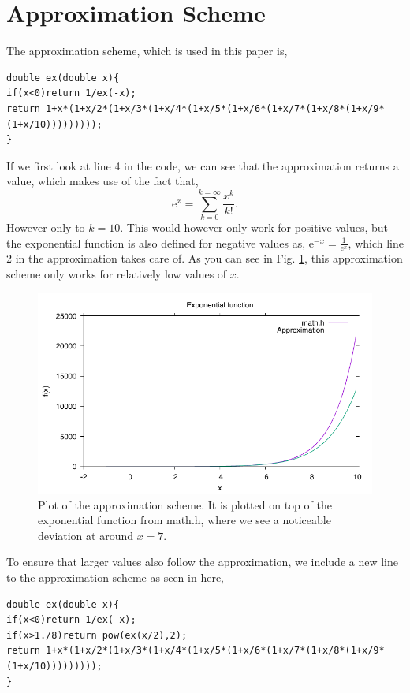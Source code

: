 \documentclass[12pt,a4paper,oneside]{article}
\begin{document}
\section{Approximation Scheme}
The approximation scheme, which is used in this paper is,
\begin{lstlisting}[style=CStyle]
double ex(double x){
if(x<0)return 1/ex(-x);
return 1+x*(1+x/2*(1+x/3*(1+x/4*(1+x/5*(1+x/6*(1+x/7*(1+x/8*(1+x/9*(1+x/10)))))))));
}
\end{lstlisting}
If we first look at line 4 in the code, we can see that the approximation returns a value, which makes use of the fact that,
\begin{equation}
    \text{e}^{x}= \sum_{k=0}^{k=\infty}\frac{x^{k}}{k!}.
\end{equation}
However only to $k=10$. This would however only work for positive values, but the exponential function is also defined for negative values as, $\text{e}^{-x}=\frac{1}{\text{e}^{x}}$, which line 2 in the approximation takes care of. As you can see in Fig. \ref{fig:plot}, this approximation scheme only works for relatively low values of $x$. 
\begin{figure}[H]
  \centering
  \includegraphics[width=\textwidth]{plot.pdf}
  \caption{Plot of the approximation scheme. It is plotted on top of the exponential function from math.h, where we see a noticeable deviation at around $x=7$.}
  \label{fig:plot}
\end{figure}
To ensure that larger values also follow the approximation, we include a new line to the approximation scheme as seen in here,
\newpage
\begin{lstlisting}[style=CStyle]
double ex(double x){
if(x<0)return 1/ex(-x);
if(x>1./8)return pow(ex(x/2),2);
return 1+x*(1+x/2*(1+x/3*(1+x/4*(1+x/5*(1+x/6*(1+x/7*(1+x/8*(1+x/9*(1+x/10)))))))));
}
\end{lstlisting}
\end{document}
